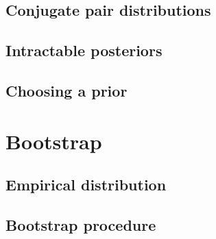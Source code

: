 \documentclass[../Year1/Year1.tex]{subfiles}
\begin{document}
\subsection{Conjugate pair distributions}
\subsection{Intractable posteriors}
\subsection{Choosing a prior}
\section{Bootstrap}
\subsection{Empirical distribution}
\subsection{Bootstrap procedure}
\end{document}

